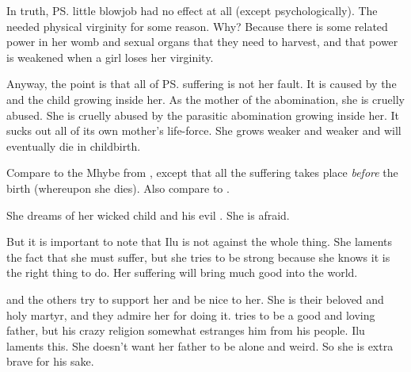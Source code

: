 In truth, \ps{\Ilu}{} little blowjob had no effect at all (except psychologically). The \banes{} needed physical virginity for some reason. Why? Because there is some  related power in her womb and sexual organs that they need to harvest, and that power is weakened when a girl loses her virginity. 

Anyway, the point is that all of \ps{\Ilu}{} suffering is not her fault. It is caused by the \banes{} and the \halfbane{} child growing inside her. 
As the mother of the \erebean{} abomination, she is cruelly abused. 
She is cruelly abused by the parasitic abomination growing inside her. It sucks out all of its own mother's life-force. She grows weaker and weaker and will eventually die in childbirth. 


Compare to the Mhybe from \cite{StevenErikson:MemoriesofIce}, except that all the suffering takes place \emph{before} the birth (whereupon she dies). Also compare to . 

She dreams of her wicked child and his evil . 
She is afraid. 

But it is important to note that Ilu is not against the whole thing. 
She laments the fact that she must suffer, but she tries to be strong because she knows it is the right thing to do. 
Her suffering will bring much good into the world. 

\Semiza{} and the others try to support her and be nice to her. 
She is their beloved and holy martyr, and they admire her for doing it. 
\Semiza{} tries to be a good and loving father, but his crazy religion somewhat estranges him from his people. 
Ilu laments this. 
She doesn't want her father to be alone and weird. 
So she is extra brave for his sake. 

